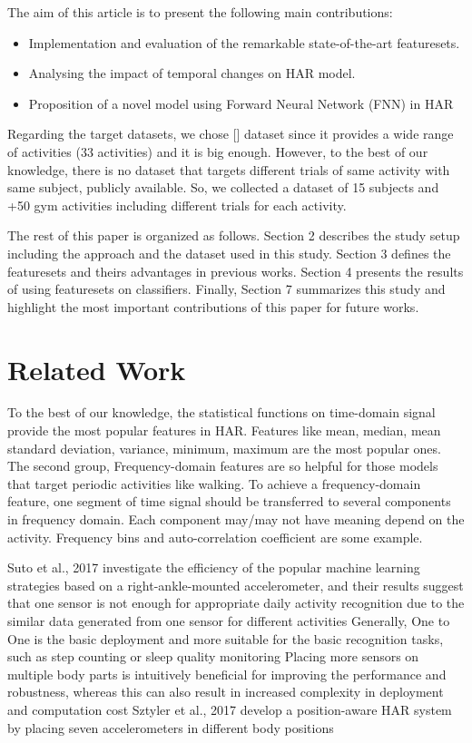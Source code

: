 \documentclass[journal,article,submit,moreauthors,pdftex]{Definitions/mdpi}
\begin{document}
The aim of this article is to present the following main contributions:
\begin{itemize}
	\item Implementation and evaluation of the remarkable state-of-the-art featuresets.
	\item Analysing the impact of temporal changes on HAR model.
	\item Proposition of a novel model using Forward Neural Network (FNN) in HAR
\end{itemize}
Regarding the target datasets, we chose [] dataset since it provides a wide range of activities (33 activities) and it is big enough. However, to the best of our knowledge, there is no dataset that targets different trials of same activity with same subject, publicly available. So, we collected a dataset of 15 subjects and +50 gym activities including different trials for each activity.

The rest of this paper is organized as follows. Section 2 describes the study setup including the approach and the dataset used in this study. Section 3 defines the featuresets and theirs advantages in previous works. Section 4 presents the results of using featuresets on classifiers. Finally, Section 7 summarizes this study and highlight the most important contributions of this paper for future works.
\section{Related Work}
To the best of our knowledge, the statistical functions on time-domain signal provide the most popular features in HAR. Features like mean, median, mean standard deviation, variance, minimum, maximum are the most popular ones. The second group, Frequency-domain features are so helpful for those models that target periodic activities like walking. To achieve a frequency-domain feature, one segment of time signal should be transferred to several components in frequency domain. Each component may/may not have meaning depend on the activity. Frequency bins and auto-correlation coefficient are some example.

Suto et al., 2017 investigate the efficiency of the popular machine learning strategies based on a right-ankle-mounted accelerometer, and their results suggest that one sensor is not enough for appropriate daily activity recognition due to the similar data generated from one sensor for different activities
Generally, One to One is the basic deployment and more suitable for the basic recognition tasks, such as step counting or sleep quality monitoring
Placing more sensors on multiple body parts is intuitively beneficial for improving the performance and robustness, whereas this can also result in increased complexity in deployment and computation cost
Sztyler et al., 2017 develop a position-aware HAR system by placing seven accelerometers in different body positions
\end{document}

